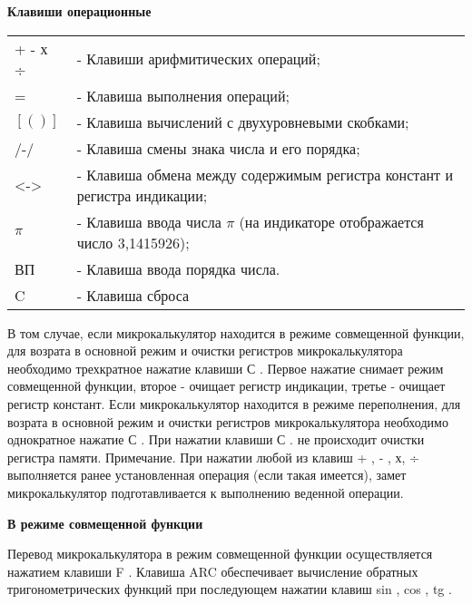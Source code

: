 \documentclass[12pt]{article} %
\begin{document}
\textbf{Клавиши операционные}
\vspace{0.5cm}

\begin{tabular}{ p{2cm} p{9cm} }
+ - х ÷ & - Клавиши арифмитических операций;\\
= & - Клавиша выполнения операций;\\ 
$[(  )]$ & - Клавиша вычислений с двухуровневыми скобками;\\
/-/ & - Клавиша смены знака числа и его порядка;\\
<-> & - Клавиша обмена между содержимым регистра констант и регистра индикации;\\
$\pi$ & - Клавиша ввода числа $\pi$ (на индикаторе отображается число 3,1415926);\\
ВП & - Клавиша ввода порядка числа.\\
C & - Клавиша сброса\\
\end{tabular}
\vspace{0.5cm}

В том случае, если микрокалькулятор находится в режиме совмещенной функции, для возрата в основной режим и очистки регистров микрокалькулятора необходимо трехкратное нажатие клавиши С . Первое нажатие снимает режим совмещенной функции, второе - очищает регистр индикации, третье - очищает регистр констант. Если микрокалькулятор находится в режиме переполнения, для возрата в основной режим и очистки регистров микрокалькулятора необходимо однократное нажатие С .
При нажатии клавиши С . не происходит очистки регистра памяти.
Примечание. При нажатии любой из клавиш + , - , х, ÷ выполняется ранее установленная операция (если такая имеется), замет микрокалькулятор подготавливается к выполнению веденной операции.

\newpage
\textbf{В режиме совмещенной функции}

Перевод микрокалькулятора в режим совмещенной функции осуществляется нажатием клавиши F . Клавиша ARC обеспечивает вычисление обратных тригонометрических функций при последующем нажатии клавиш  sin , cos , tg .
\end{document}
